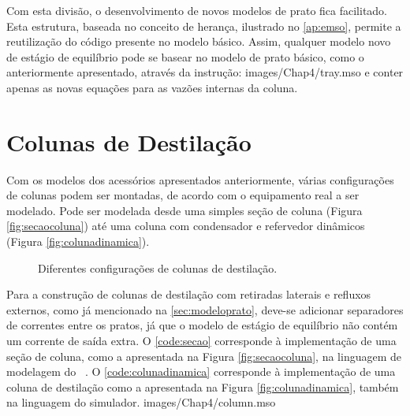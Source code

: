 Com esta divisão, o desenvolvimento de novos modelos de prato fica facilitado. Esta estrutura, baseada no conceito de
herança, ilustrado no \autoref{ap:emso}, permite a reutilização do código presente no modelo básico.
Assim, qualquer modelo novo de estágio de
equilíbrio pode se basear no modelo de prato básico, como o anteriormente apresentado, através da instrução:
\vspace{0.5cm}
 {images/Chap4/tray.mso}
e conter apenas as novas equações para as vazões internas da coluna.

\section{Colunas de Destilação} \label{sec:modelocolunas}
Com os modelos dos acessórios apresentados anteriormente, várias configurações de colunas podem ser montadas, de acordo
com o equipamento real a ser modelado. Pode ser modelada desde uma simples seção de coluna (Figura
\autoref{fig:secaocoluna}) até uma coluna com condensador e refervedor dinâmicos (Figura \autoref{fig:colunadinamica}).

\begin{figure}[htb]
\centering
  \qquad
  \caption{Diferentes configurações de colunas de destilação.}
  \label{fig:colunas}
\end{figure}

Para a construção de colunas de destilação com retiradas laterais e refluxos externos, como já mencionado
na \autoref{sec:modeloprato}, deve-se adicionar separadores de correntes entre os pratos, já que o modelo de
estágio de equilíbrio não contém um corrente de saída extra.
O \autoref{code:secao} corresponde à implementação de uma seção de coluna, como a apresentada na Figura
\autoref{fig:secaocoluna}, na linguagem de modelagem do \emso\ . O \autoref{code:colunadinamica} corresponde à
implementação de uma coluna de
destilação como a apresentada na Figura \autoref{fig:colunadinamica}, também
na linguagem do simulador.
 {images/Chap4/column.mso}

